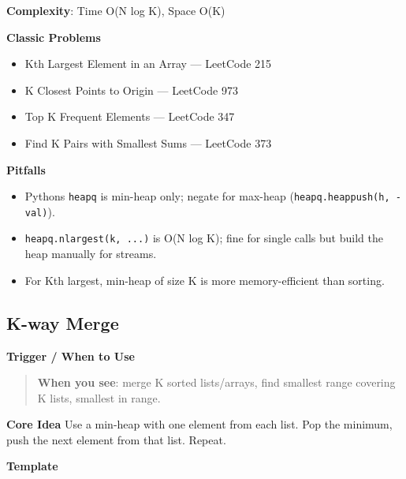 \documentclass[11pt]{article}
\providecommand{\tightlist}{\setlength{\itemsep}{1pt}\setlength{\parskip}{0pt}}
\begin{document}
\textbf{Complexity}: Time O(N log K), Space O(K)

\textbf{Classic Problems}

\begin{itemize}
\tightlist
\item
  Kth Largest Element in an Array --- LeetCode 215
\item
  K Closest Points to Origin --- LeetCode 973
\item
  Top K Frequent Elements --- LeetCode 347
\item
  Find K Pairs with Smallest Sums --- LeetCode 373
\end{itemize}

\textbf{Pitfalls}

\begin{itemize}
\tightlist
\item
  Python\textquotesingle s \texttt{heapq} is min-heap only; negate for max-heap (\texttt{heapq.heappush(h,\ -val)}).
\item
  \texttt{heapq.nlargest(k,\ ...)} is O(N log K); fine for single calls but build the heap manually for streams.
\item
  For Kth largest, min-heap of size K is more memory-efficient than sorting.
\end{itemize}

\subsection{K-way Merge}\label{k-way-merge}

\textbf{Trigger / When to Use}

\begin{quote}
\textbf{When you see}: merge K sorted lists/arrays, find smallest range covering K lists, smallest in range.
\end{quote}

\textbf{Core Idea}
Use a min-heap with one element from each list. Pop the minimum, push the next element from that list. Repeat.

\textbf{Template}

\end{document}
